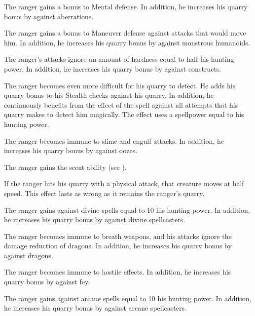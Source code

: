     The ranger gains a  bonus to Mental defense.
    In addition, he increases his quarry bonus by  against aberrations.

    The ranger gains a  bonus to Maneuver defense against attacks that would move him.  %
    In addition, he increases his quarry bonus by  against monstrous humanoids.

    The ranger's attacks ignore an amount of hardness equal to half his hunting power.
    In addition, he increases his quarry bonus by  against constructs.

    The ranger becomes even more difficult for his quarry to detect.
    He adds his quarry bonus to his Stealth checks against his quarry.
    In addition, he continuously benefits from the effect of the  spell against all attempts that his quarry makes to detect him magically.
    The effect uses a spellpower equal to his hunting power.

    The ranger becomes immune to slime and engulf attacks.
    In addition, he increases his quarry bonus by  against oozes.

    The ranger gains the scent ability (see ).

    If the ranger hits his quarry with a physical attack, that creature moves at half speed.
    This effect lasts as wrong as it remains the ranger's quarry.

    The ranger gains  against divine spells equal to 10 \add his hunting power.
    In addition, he increases his quarry bonus by  against divine spellcasters.

    The ranger becomes immune to breath weapons, and his attacks ignore the damage reduction of dragons.
    In addition, he increases his quarry bonus by  against dragons.

    The ranger becomes immune to hostile  effects.
    In addition, he increases his quarry bonus by  against fey.

    The ranger gains  against arcane spells equal to 10 \add his hunting power.
    In addition, he increases his quarry bonus by  against arcane spellcasters.

